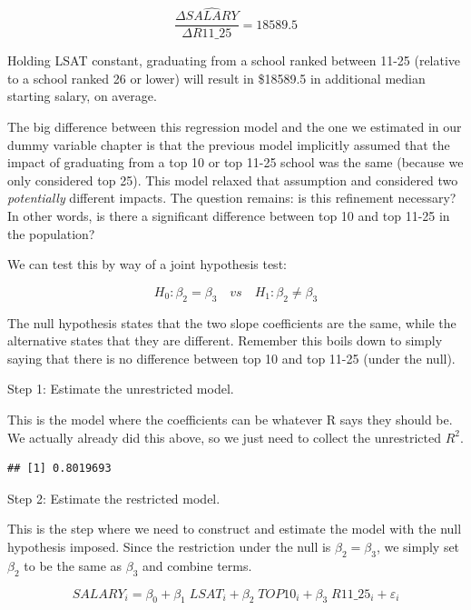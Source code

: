 \documentclass[
]{book}
\newenvironment{Shaded}{\begin{snugshade}}{\end{snugshade}}
\newcommand{\AttributeTok}[1]{\textcolor[rgb]{0.13,0.29,0.53}{#1}}
\newcommand{\FunctionTok}[1]{\textcolor[rgb]{0.13,0.29,0.53}{\textbf{#1}}}
\newcommand{\NormalTok}[1]{#1}
\newcommand{\SpecialCharTok}[1]{\textcolor[rgb]{0.81,0.36,0.00}{\textbf{#1}}}
\begin{document}
\[\frac{\Delta \widehat{SALARY}}{\Delta R11\_25} = 18589.5\]

Holding LSAT constant, graduating from a school ranked between 11-25 (relative to a school ranked 26 or lower) will result in \$18589.5 in additional median starting salary, on average.

The big difference between this regression model and the one we estimated in our dummy variable chapter is that the previous model implicitly assumed that the impact of graduating from a top 10 or top 11-25 school was the same (because we only considered top 25). This model relaxed that assumption and considered two \emph{potentially} different impacts. The question remains: is this refinement necessary? In other words, is there a significant difference between top 10 and top 11-25 in the population?

We can test this by way of a joint hypothesis test:

\[H_0: \beta_2 = \beta_3 \quad vs \quad H_1: \beta_2 \neq \beta_3\]

The null hypothesis states that the two slope coefficients are the same, while the alternative states that they are different. Remember this boils down to simply saying that there is no difference between top 10 and top 11-25 (under the null).

Step 1: Estimate the unrestricted model.

This is the model where the coefficients can be whatever R says they should be. We actually already did this above, so we just need to collect the unrestricted \(R^2\).

\begin{Shaded}
\end{Shaded}

\begin{verbatim}
## [1] 0.8019693
\end{verbatim}

Step 2: Estimate the restricted model.

This is the step where we need to construct and estimate the model with the null hypothesis imposed. Since the restriction under the null is \(\beta_2 = \beta_3\), we simply set \(\beta_2\) to be the same as \(\beta_3\) and combine terms.

\[SALARY_i = \beta_0 + \beta_1 \; LSAT_i + \beta_2 \; TOP10_i + \beta_3 \; R11\_25_i + \varepsilon_i\]
\end{document}
